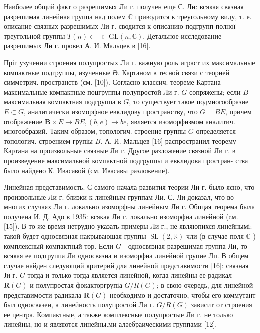 \documentclass[10pt]{article}
\begin{document}
Наиболее общий факт о разрешимых Ли г. получен еще С. Ли: всякая связная разрешимая линейная группа над полем $\mathbb{C}$ приводится к треугольному виду, т. е. описание связных разрешимых Ли г. сводится к описанию подгрупп полної треугольной группы $T(n) \subset$ $\subset \mathrm{GL}(n, \mathbb{C})$. Детальное исследование разрешимых Ли г. провел А. И. Мальцев в [16].



Пріг узучении строения полупростых Ли г. важную роль играст их максимальные компактные подгруппы, изученные Ә. Картаном в тесноӥ связи с теорией симметрич. пространств (см. [10]). Согласно классич. теореме Картана максимальные компактные поцгруппы полупростой Ли г. $G$ сопряжены; если $B$ - максимальная компактная подгруппа в $G$, то существует такое подмногообразие $E \subset G$, аналитически изоморфное евклидову пространству, что $G=B E$, причем отображение $\boldsymbol{B} \times E \rightarrow B E,(b, e) \rightarrow b e$, является изоморфизмом аналитич. многообразий. Таким образом, топологич. строение группы $G$ определяется топологич. строением групіы $B$. А. И. Мальцев [16] распространил теорему Картана на произвольные связные Ли г. Другое разложение связной Ли г. в произведение максимальной компактной подгруппы и евклидова простран- ства было найдено К. Ивасавой (см. Ивасавы разложение).



Линейная представимость. С самого начала развития теории Ли г. было ясно, что произвольные Ли г. близки к линейным группам Ли. С. Ли доказал, что во многих случаях Ли г. локально изоморфны линейным Ли г. Обпцая теорема была получена И. Д. Адо в 1935: всякая Ли г. локально изоморфна линейной (cм. [15]). В то же время нетрудно указать примеры Ли г., не являюпихся линейнымі: такой будет односвязная накрывающая группы $\operatorname{SL}(2, \mathbb{R})$ чли (в случае поля $\mathbb{C}$ ) комплексный компактный тор. Если $G$ - односвязная разрешимая группа Ли, то всякая ее подгруппа Ли односвязна и изоморфна линейной групие Лп. В общем случае найден следующий критерий для линейной представимости [16]: связная Ји г. $G$ тогда и только тогда является линейной, когда линейны ее радикал $\boldsymbol{R}(G)$ и полупростая фокакторгрупіа $G / R(G)$; в свою очередь, для линейной представимости радикала $\boldsymbol{R}(G)$ необходимо и достаточно, чтобы его коммутант был односвязен, а линейность полупростой Ли г. $G / R(G)$ зависит от строения ее центра. Компактные, а также комплексные полупростые Ли г. не только линейны, но и являются линейны.ми аләебраическими группами [12].
\end{document}

